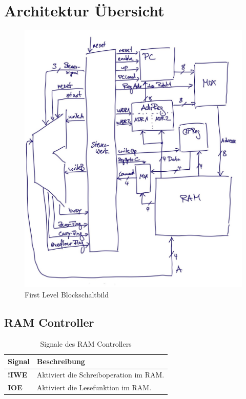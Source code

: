 \chapter{Architektur Übersicht}
\label{chap:Architektur-Übersicht}


\begin{figure}[H]
  \centering
  \includegraphics[scale=0.25]
  {content/figures/BSB_SW.jpg}
  \caption{First Level Blockschaltbild}
  \label{fig:blockschaltbild-first-level}
\end{figure}


\section{RAM Controller}
\label{sec:ram}

\begin{table}[H]
  \centering
  \begin{tabular}{|l|p{10cm}|}
    \hline
    \textbf{Signal} & \textbf{Beschreibung}                  \\ \hline
    \textbf{!IWE}   & Aktiviert die Schreiboperation im RAM. \\ \hline
    \textbf{IOE}    & Aktiviert die Lesefunktion im RAM.     \\ \hline
  \end{tabular}
  \caption{Signale des RAM Controllers}
\end{table}




